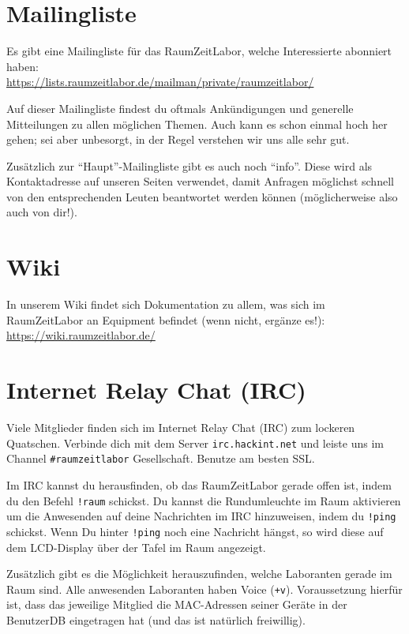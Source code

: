 \documentclass[12pt, DIV16, a4paper]{scrartcl}
\begin{document}
\section*{Mailingliste}

Es gibt eine Mailingliste für das RaumZeitLabor, welche Interessierte abonniert
haben:\\
\url{https://lists.raumzeitlabor.de/mailman/private/raumzeitlabor/}
\np

Auf dieser Mailingliste findest du oftmals Ankündigungen und generelle
Mitteilungen zu allen möglichen Themen. Auch kann es schon einmal hoch her
gehen; sei aber unbesorgt, in der Regel verstehen wir uns alle sehr gut.
\np

Zusätzlich zur ``Haupt''-Mailingliste gibt es auch noch ``info''. Diese wird als
Kontaktadresse auf unseren Seiten verwendet, damit Anfragen möglichst schnell
von den entsprechenden Leuten beantwortet werden können (möglicherweise also
auch von dir!).

\section*{Wiki}

In unserem Wiki findet sich Dokumentation zu allem, was sich im RaumZeitLabor
an Equipment befindet (wenn nicht, ergänze es!):
\url{https://wiki.raumzeitlabor.de/}

\section*{Internet Relay Chat (IRC)}

Viele Mitglieder finden sich im Internet Relay Chat (IRC) zum lockeren
Quatschen. Verbinde dich mit dem Server \texttt{irc.hackint.net} und leiste uns
im Channel \texttt{\#raumzeitlabor} Gesellschaft. Benutze am besten SSL.
\np

Im IRC kannst du herausfinden, ob das RaumZeitLabor gerade offen ist, indem du
den Befehl \texttt{!raum} schickst. Du kannst die Rundumleuchte im Raum
aktivieren um die Anwesenden auf deine Nachrichten im IRC hinzuweisen, indem du
\texttt{!ping} schickst. Wenn Du hinter \texttt{!ping} noch eine Nachricht
hängst, so wird diese auf dem LCD-Display über der Tafel im Raum angezeigt.
\np

Zusätzlich gibt es die Möglichkeit herauszufinden, welche Laboranten gerade im
Raum sind. Alle anwesenden Laboranten haben Voice (\texttt{+v}). Voraussetzung
hierfür ist, dass das jeweilige Mitglied die MAC-Adressen seiner Geräte in der
BenutzerDB eingetragen hat (und das ist natürlich freiwillig).
\end{document}
